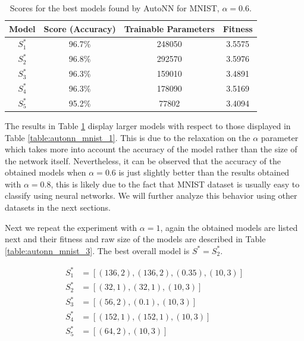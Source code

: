 \documentclass[journal]{IEEEtran}
\begin{document}
\begin{table}[!htb]
\begin{center}
\begin{tabular}{| c | c | c | c |}
\hline
Model & Score (Accuracy) & Trainable Parameters & Fitness\\
\hline
$S^*_1$ & 96.7\% & 248050 & 3.5575\\
$S^*_2$ & 96.8\% & 292570 & 3.5976\\
$S^*_3$ & 96.3\% & 159010 & 3.4891\\
$S^*_4$ & 96.3\% & 178090 & 3.5169\\
$S^*_5$ & 95.2\% & 77802 & 3.4094\\
\hline
\end{tabular}
\end{center}
\caption{Scores for the best models found by AutoNN for MNIST, $\alpha = 0.6$.}
\label{table:autonn_mnist_2}
\end{table}

The results in Table \ref{table:autonn_mnist_2} display larger models with respect to those displayed in Table \ref{table:autonn_mnist_1}. This is due to the relaxation on the $\alpha$ parameter which takes more into account the accuracy of the model rather than the size of the network itself. Nevertheless, it can be observed that the accuracy of the obtained models when $\alpha=0.6$ is just slightly better than the results obtained with $\alpha=0.8$, this is likely due to the fact that MNIST dataset is usually easy to classify using neural networks. We will further analyze this behavior using other datasets in the next sections.

Next we repeat the experiment with $\alpha = 1$, again the obtained models are listed next and their fitness and raw size of the models are described in Table \ref{table:autonn_mnist_3}. The best overall model is $S^* = S^*_2$.

\begin{align*}
S^*_1 & = \left[ (136, 2), (136, 2), (0.35), (10, 3) \right] \\
S^*_2 & = \left[ (32, 1), (32, 1), (10, 3) \right] \\
S^*_3 & = \left[ (56, 2), (0.1), (10, 3) \right] \\
S^*_4 & = \left[ (152, 1), (152, 1), (10, 3) \right] \\
S^*_5 & = \left[ (64, 2),  (10, 3) \right] \\
\end{align*}
\end{document}
